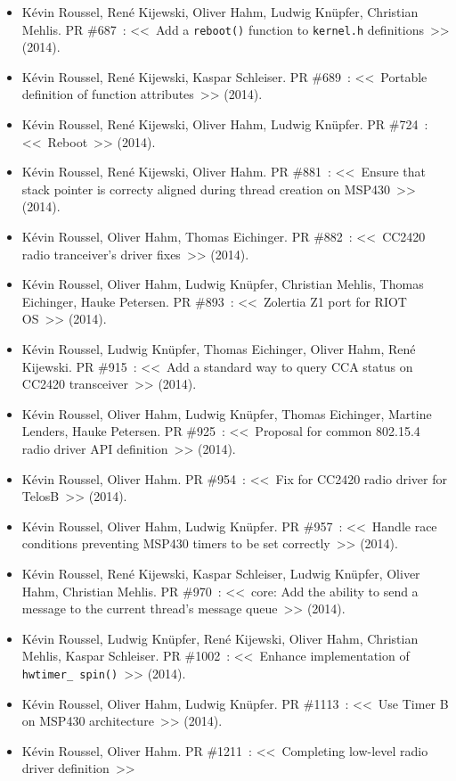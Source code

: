 \documentclass[10pt,c]{beamer}
\begin{document}
\begin{frame}[allowframebreaks]
\begin{itemize}
\item Kévin Roussel, René Kijewski, Oliver Hahm, Ludwig Knüpfer,
      Christian Mehlis.
PR \#687~: <<~Add a \texttt{reboot()} function to \texttt{kernel.h}
              definitions~>>
(2014).
\item Kévin Roussel, René Kijewski, Kaspar Schleiser.
PR \#689~: <<~Portable definition of function attributes~>>
(2014).
\item Kévin Roussel, René Kijewski, Oliver Hahm, Ludwig Knüpfer.
PR \#724~: <<~Reboot~>>
(2014).
\item Kévin Roussel, René Kijewski, Oliver Hahm.
PR \#881~: <<~Ensure that stack pointer is correcty aligned during
              thread creation on MSP430~>>
(2014).
\item Kévin Roussel, Oliver Hahm, Thomas Eichinger.
PR \#882~: <<~CC2420 radio tranceiver's driver fixes~>>
(2014).
\item Kévin Roussel, Oliver Hahm, Ludwig Knüpfer, Christian Mehlis,
      Thomas Eichinger, Hauke Petersen.
PR \#893~: <<~Zolertia Z1 port for RIOT OS~>>
(2014).
\item Kévin Roussel, Ludwig Knüpfer, Thomas Eichinger, Oliver Hahm,
      René Kijewski.
PR \#915~: <<~Add a standard way to query CCA status on CC2420 transceiver~>>
(2014).
\item Kévin Roussel, Oliver Hahm, Ludwig Knüpfer, Thomas Eichinger,
      Martine Lenders, Hauke Petersen.
PR \#925~: <<~Proposal for common 802.15.4 radio driver API definition~>>
(2014).
\item Kévin Roussel, Oliver Hahm.
PR \#954~: <<~Fix for CC2420 radio driver for TelosB~>>
(2014).
\item Kévin Roussel, Oliver Hahm, Ludwig Knüpfer.
PR \#957~: <<~Handle race conditions preventing MSP430 timers to be set
              correctly~>>
(2014).
\item Kévin Roussel, René Kijewski, Kaspar Schleiser, Ludwig Knüpfer,
      Oliver Hahm, Christian Mehlis.
PR \#970~: <<~core: Add the ability to send a message to the current
              thread's message queue~>>
(2014).
\item Kévin Roussel, Ludwig Knüpfer, René Kijewski, Oliver Hahm,
      Christian Mehlis, Kaspar Schleiser.
PR \#1002~: <<~Enhance implementation of \texttt{hwtimer\_ spin()}~>>
(2014).
\item Kévin Roussel, Oliver Hahm, Ludwig Knüpfer.
PR \#1113~: <<~Use Timer B on MSP430 architecture~>>
(2014).
\item Kévin Roussel, Oliver Hahm.
PR \#1211~: <<~Completing low-level radio driver definition~>>

\end{itemize}
\end{frame}
\end{document}
